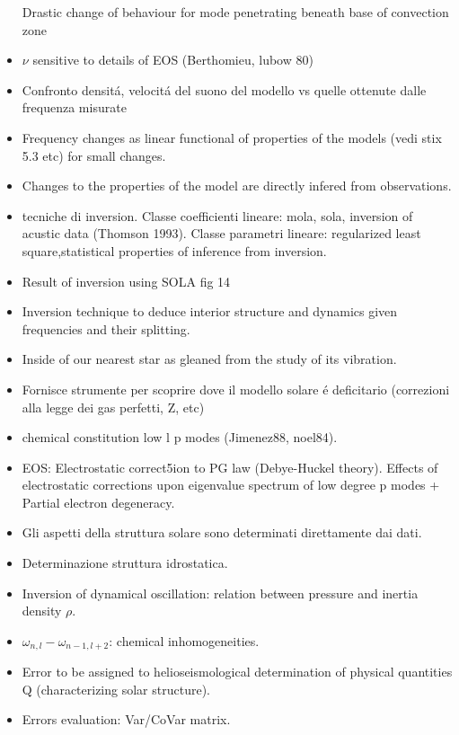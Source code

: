 \documentclass[../main.tex]{subfiles}
\begin{document}
\begin{itemize}
    \clearpage
    
    Drastic change of behaviour for mode penetrating beneath base of convection zone
    
    \item $\nu$ sensitive to details of EOS (Berthomieu, lubow 80)
    \item Confronto densit\'a, velocit\'a del suono del modello vs quelle ottenute dalle frequenza misurate
    \item Frequency changes as linear functional of properties of the models (vedi stix 5.3 etc) for small changes.
    \item Changes to the properties of the model are directly infered from observations.
    \item tecniche di inversion. Classe coefficienti lineare: mola, sola, inversion of acustic data (Thomson 1993). Classe parametri lineare: regularized least square,statistical properties of inference from inversion.
    \item Result of inversion using SOLA fig 14
    \item Inversion technique to deduce interior structure and dynamics given frequencies and their splitting.
    \item Inside of our nearest star as gleaned from the study of its vibration.
    \item Fornisce strumente per scoprire dove il modello solare \'e deficitario (correzioni alla legge dei gas perfetti, Z, etc)
    \item chemical constitution low l p modes (Jimenez88, noel84).
    \item EOS: Electrostatic correct5ion to PG law (Debye-Huckel theory). Effects of electrostatic corrections upon eigenvalue spectrum of low degree p modes + Partial electron degeneracy.
    \item Gli aspetti della struttura solare sono determinati direttamente dai dati.
    \item Determinazione struttura idrostatica.
    \item Inversion of dynamical oscillation: relation between pressure and inertia density $\rho$.
    \item $\omega_{n,l}-\omega_{n-1,l+2}$: chemical inhomogeneities.
    \item Error to be assigned to helioseismological determination of physical quantities Q (characterizing solar structure).
    \item Errors evaluation: Var/CoVar matrix.
\end{itemize}
\end{document}
